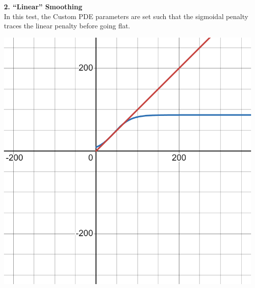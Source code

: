 \documentclass{article}
\begin{document}
  \newpage
  \noindent
  \textbf{2. ``Linear'' Smoothing}\\
  In this test, the Custom PDE parameters are set such that the sigmoidal penalty
  traces the linear penalty before going flat.
  \begin{center}
    \includegraphics[scale=0.1]{../report_images/linear_smoothing.png}\\
  \end{center}
\end{document}
